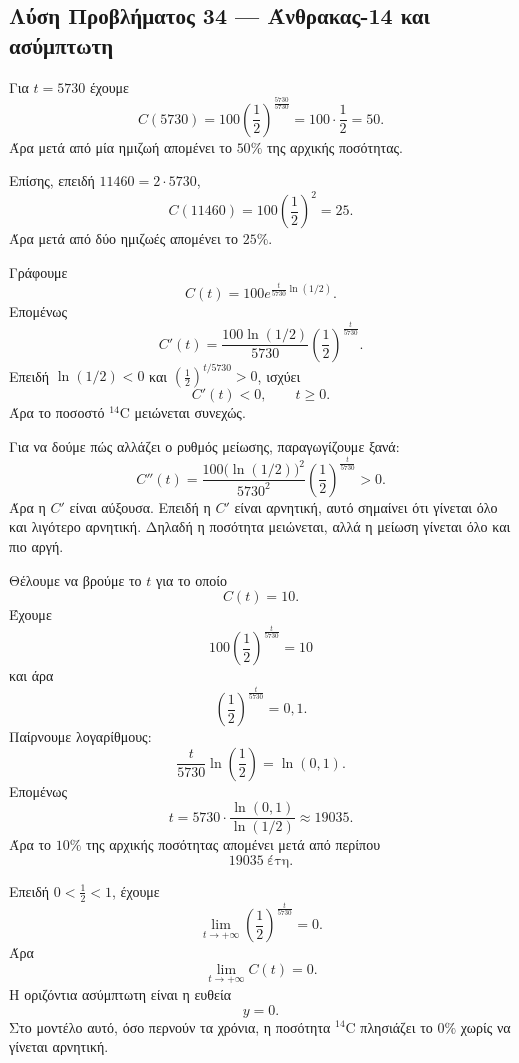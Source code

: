 \subsection*{Λύση Προβλήματος 34 --- Άνθρακας-14 και ασύμπτωτη}

\begin{alist}
  \item Για $t=5730$ έχουμε
        \[
          C(5730)
          =
          100\left(\frac12\right)^{\frac{5730}{5730}}
          =
          100\cdot\frac12
          =
          50.
        \]
        Άρα μετά από μία ημιζωή απομένει το $50\%$ της αρχικής
        ποσότητας.

        Επίσης, επειδή $11460=2\cdot5730$,
        \[
          C(11460)
          =
          100\left(\frac12\right)^2
          =
          25.
        \]
        Άρα μετά από δύο ημιζωές απομένει το $25\%$.

  \item Γράφουμε
        \[
          C(t)=100e^{\frac{t}{5730}\ln(1/2)}.
        \]
        Επομένως
        \[
          C'(t)
          =
          \frac{100\ln(1/2)}{5730}
          \left(\frac12\right)^{\frac{t}{5730}}.
        \]
        Επειδή $\ln(1/2)<0$ και
        $\left(\frac12\right)^{t/5730}>0$, ισχύει
        \[
          C'(t)<0,\qquad t\geq0.
        \]
        Άρα το ποσοστό $^{14}\mathrm{C}$ μειώνεται συνεχώς.

        Για να δούμε πώς αλλάζει ο ρυθμός μείωσης, παραγωγίζουμε ξανά:
        \[
          C''(t)
          =
          \frac{100\bigl(\ln(1/2)\bigr)^2}{5730^2}
          \left(\frac12\right)^{\frac{t}{5730}}>0.
        \]
        Άρα η $C'$ είναι αύξουσα. Επειδή η $C'$ είναι αρνητική, αυτό
        σημαίνει ότι γίνεται όλο και λιγότερο αρνητική. Δηλαδή η
        ποσότητα μειώνεται, αλλά η μείωση γίνεται όλο και πιο αργή.

  \item Θέλουμε να βρούμε το $t$ για το οποίο
        \[
          C(t)=10.
        \]
        Έχουμε
        \[
          100\left(\frac12\right)^{\frac{t}{5730}}=10
        \]
        και άρα
        \[
          \left(\frac12\right)^{\frac{t}{5730}}=0{,}1.
        \]
        Παίρνουμε λογαρίθμους:
        \[
          \frac{t}{5730}\ln\left(\frac12\right)=\ln(0{,}1).
        \]
        Επομένως
        \[
          t=
          5730\cdot
          \frac{\ln(0{,}1)}{\ln(1/2)}
          \approx19035.
        \]
        Άρα το $10\%$ της αρχικής ποσότητας απομένει μετά από περίπου
        \[
          {19035\ \text{έτη}}.
        \]

  \item Επειδή $0<\frac12<1$, έχουμε
        \[
          \lim_{t\to+\infty}
          \left(\frac12\right)^{\frac{t}{5730}}
          =
          0.
        \]
        Άρα
        \[
          {\lim_{t\to+\infty}C(t)=0}.
        \]
        Η οριζόντια ασύμπτωτη είναι η ευθεία
        \[
          {y=0}.
        \]
        Στο μοντέλο αυτό, όσο περνούν τα χρόνια, η ποσότητα
        $^{14}\mathrm{C}$ πλησιάζει το $0\%$ χωρίς να γίνεται αρνητική.
\end{alist}
